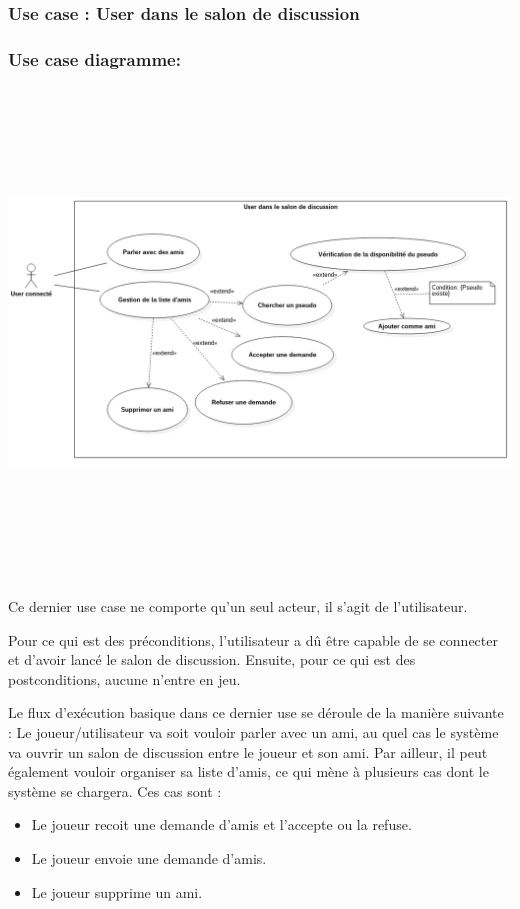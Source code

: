 \documentclass[10pt,a4paper]{article}
\begin{document}
\newpage

\subsubsection{Use case : User dans le salon de discussion}
\subsubsection{Use case diagramme:}	

  
\includegraphics[height=13cm,width=18.5cm, left]{user_salon_de_discussion.png}
	

\par Ce dernier use case ne comporte qu'un seul acteur, il s'agit de l'utilisateur.\\

\par Pour ce qui est des préconditions, l'utilisateur a dû être capable de se connecter et d'avoir lancé le salon de discussion. Ensuite, pour ce qui est des postconditions, aucune n'entre en jeu.\\

\par Le flux d'exécution basique dans ce dernier use se déroule de la manière suivante :
Le joueur/utilisateur va soit vouloir parler avec un ami, au quel cas le système va ouvrir un salon de discussion entre le joueur et son ami. Par ailleur, il peut également vouloir organiser sa liste d'amis, ce qui mène à plusieurs cas dont le système se chargera. Ces cas sont :
\begin{itemize}
	\item Le joueur recoit une demande d'amis et l'accepte ou la refuse.
    \item Le joueur envoie une demande d'amis.
    \item Le joueur supprime un ami.
\end{itemize}
\newpage	
\end{document}
